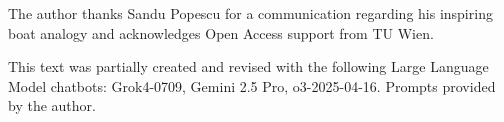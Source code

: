 \documentclass[reprint,aps,pra,superscriptaddress,longbibliography]{revtex4-2}
\begin{document}
\begin{acknowledgments}
The author thanks Sandu Popescu for a communication regarding his inspiring boat analogy and acknowledges Open Access support from TU Wien.

This text was partially created and revised with the following Large Language Model chatbots: Grok4-0709, Gemini 2.5 Pro, o3-2025-04-16. Prompts provided by the author.
\end{acknowledgments}

%

\end{document}
